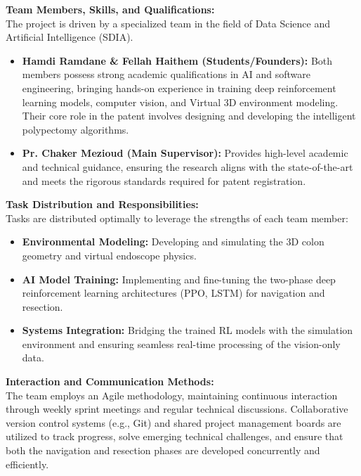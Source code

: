 \vspace{0.2cm}
\textbf{Team Members, Skills, and Qualifications:} \\
The project is driven by a specialized team in the field of Data Science and Artificial Intelligence (SDIA). 
\begin{itemize}
    \item \textbf{Hamdi Ramdane \& Fellah Haithem (Students/Founders):} Both members possess strong academic qualifications in AI and software engineering, bringing hands-on experience in training deep reinforcement learning models, computer vision, and Virtual 3D environment modeling. Their core role in the patent involves designing and developing the intelligent polypectomy algorithms.
    \item \textbf{Pr. Chaker Mezioud (Main Supervisor):} Provides high-level academic and technical guidance, ensuring the research aligns with the state-of-the-art and meets the rigorous standards required for patent registration.
\end{itemize}

\vspace{0.2cm}
\textbf{Task Distribution and Responsibilities:} \\
Tasks are distributed optimally to leverage the strengths of each team member:
\begin{itemize}
    \item \textbf{Environmental Modeling:} Developing and simulating the 3D colon geometry and virtual endoscope physics.
    \item \textbf{AI Model Training:} Implementing and fine-tuning the two-phase deep reinforcement learning architectures (PPO, LSTM) for navigation and resection.
    \item \textbf{Systems Integration:} Bridging the trained RL models with the simulation environment and ensuring seamless real-time processing of the vision-only data.
\end{itemize}

\vspace{0.2cm}
\textbf{Interaction and Communication Methods:} \\
The team employs an Agile methodology, maintaining continuous interaction through weekly sprint meetings and regular technical discussions. Collaborative version control systems (e.g., Git) and shared project management boards are utilized to track progress, solve emerging technical challenges, and ensure that both the navigation and resection phases are developed concurrently and efficiently.

